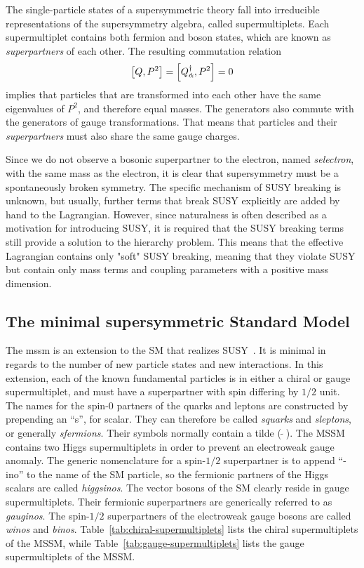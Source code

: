The single-particle states of a supersymmetric theory fall into irreducible representations of the supersymmetry algebra, called supermultiplets. Each supermultiplet contains both fermion and boson states, which are known as \emph{superpartners} of each other. The resulting commutation relation
\begin{equation}
\comm{Q}{P^2}=\comm{Q^{\dagger}_{\dot{\alpha}}}{P^2}=0
\end{equation}
implies that particles that are transformed into each other have the same eigenvalues of $P^2$, and therefore equal masses. The generators also commute with the generators of gauge transformations. That means that particles and their \emph{superpartners} must also share the same gauge charges.

Since we do not observe a bosonic superpartner to the electron, named \emph{selectron}, with the same mass as the electron, it is clear that supersymmetry must be a spontaneously broken symmetry. The specific mechanism of SUSY breaking is unknown, but usually, further terms that break SUSY explicitly are added by hand to the Lagrangian. However, since naturalness is often described as a motivation for introducing SUSY, it is required that the SUSY breaking terms still provide a solution to the hierarchy problem. This means that the effective Lagrangian contains only "soft" SUSY breaking, meaning that they violate SUSY but contain only mass terms and coupling parameters with a positive mass dimension.

\subsection{The minimal supersymmetric Standard Model}
\label{sec:MSSM}

The \gls{mssm} is an extension to the SM that realizes SUSY~\cite{MARTIN_1998}. It is minimal in regards to the number of new particle states and new interactions. In this extension, each of the known fundamental particles is in either a chiral or gauge supermultiplet, and must have a superpartner with spin differing by $1/2$ unit. The names for the spin-0 partners of the quarks and leptons are constructed by prepending an “s”, for scalar. They can therefore be called \emph{squarks} and \emph{sleptons}, or generally \emph{sfermions}. Their symbols normally contain a tilde ($\widetilde{\,\,\,}$). The MSSM contains two Higgs supermultiplets in order to prevent an electroweak gauge anomaly. The generic nomenclature for a spin-$1/2$ superpartner is to append “-ino” to the name of the SM particle, so the fermionic partners of the Higgs scalars are called \emph{higgsinos}. The vector bosons of the SM clearly reside in gauge supermultiplets. Their fermionic superpartners are generically referred to as \emph{gauginos}. The spin-$1/2$ superpartners of the electroweak gauge bosons are called \emph{winos} and \emph{binos}. Table~\ref{tab:chiral-supermultiplets} lists the chiral supermultiplets of the MSSM, while Table~\ref{tab:gauge-supermultiplets} lists the gauge supermultiplets of the MSSM.

